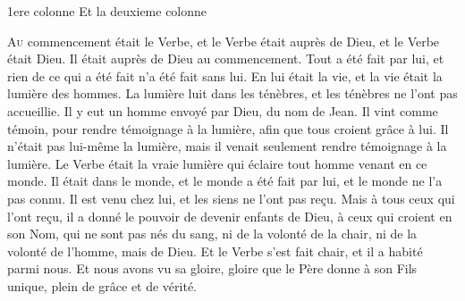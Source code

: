 \documentclass[%
fontsize=10%
,a5paper%
,DIV=15%
]{scrartcl}
\title{\centrer{Sacrement de Mariage suivi de la messe}}
\author{}
\date{}
\begin{document}
	
	\begin{paracol}{2}

	\switchcolumn\switchcolumn*
 	1ere colonne
	\switchcolumn
	Et la deuxieme colonne
	\end{paracol}%
	

{\lettrine[lhang=1, nindent=0pt, lines=3]{A}{u} commencement était le Verbe, et le Verbe était auprès de Dieu, et le Verbe était Dieu. Il était auprès de Dieu au commencement. Tout a été fait par lui, et rien de ce qui a été fait n'a été fait sans lui. En lui était la vie, et la vie était la lumière des hommes. La lumière luit dans les ténèbres, et les ténèbres ne l'ont pas accueillie. Il y eut un homme envoyé par Dieu, du nom de Jean. Il vint comme témoin, pour rendre témoignage à la lumière, afin que tous croient grâce à lui. Il n'était pas lui-même la lumière, mais il venait seulement rendre témoignage à la lumière. Le Verbe était la vraie lumière qui éclaire tout homme venant en ce monde. Il était dans le monde, et le monde a été fait par lui, et le monde ne l'a pas connu. Il est venu chez lui, et les siens ne l'ont pas reçu. Mais à tous ceux qui l'ont reçu, il a donné le pouvoir de devenir enfants de Dieu, à ceux qui croient en son Nom, qui ne sont pas nés du sang, ni de la volonté de la chair, ni de la volonté de l'homme, mais de Dieu. Et le Verbe s'est fait chair, et il a habité parmi nous. Et nous avons vu sa gloire, gloire que le Père donne à son Fils unique, plein de grâce et de vérité.}
\end{document}

